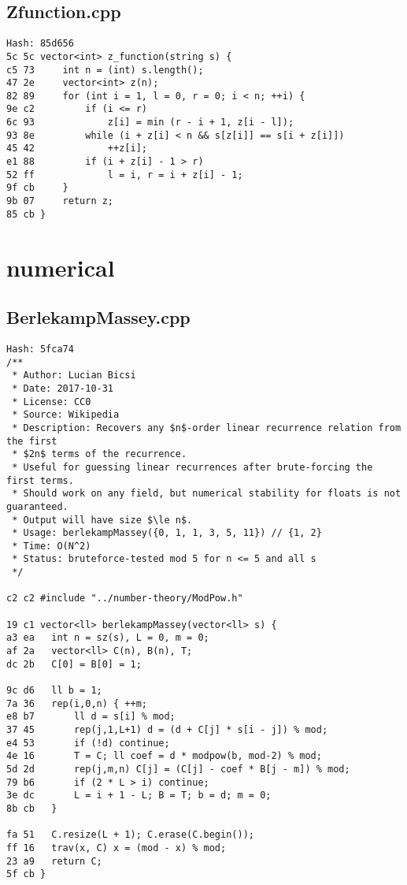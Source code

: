 \documentclass[11pt, a4paper, twoside]{article}
\begin{document}
\subsection{Zfunction.cpp}
\begin{lstlisting}
Hash: 85d656
5c 5c vector<int> z_function(string s) {
c5 73     int n = (int) s.length();
47 2e     vector<int> z(n);
82 89     for (int i = 1, l = 0, r = 0; i < n; ++i) {
9e c2         if (i <= r)
6c 93             z[i] = min (r - i + 1, z[i - l]);
93 8e         while (i + z[i] < n && s[z[i]] == s[i + z[i]])
45 42             ++z[i];
e1 88         if (i + z[i] - 1 > r)
52 ff             l = i, r = i + z[i] - 1;
9f cb     }
9b 07     return z;
85 cb }
\end{lstlisting}



%
%

\section{numerical}

\subsection{BerlekampMassey.cpp}
\begin{lstlisting}
Hash: 5fca74
/**
 * Author: Lucian Bicsi
 * Date: 2017-10-31
 * License: CC0
 * Source: Wikipedia
 * Description: Recovers any $n$-order linear recurrence relation from the first
 * $2n$ terms of the recurrence.
 * Useful for guessing linear recurrences after brute-forcing the first terms.
 * Should work on any field, but numerical stability for floats is not guaranteed.
 * Output will have size $\le n$.
 * Usage: berlekampMassey({0, 1, 1, 3, 5, 11}) // {1, 2}
 * Time: O(N^2)
 * Status: bruteforce-tested mod 5 for n <= 5 and all s
 */

c2 c2 #include "../number-theory/ModPow.h"

19 c1 vector<ll> berlekampMassey(vector<ll> s) {
a3 ea 	int n = sz(s), L = 0, m = 0;
af 2a 	vector<ll> C(n), B(n), T;
dc 2b 	C[0] = B[0] = 1;
      
9c d6 	ll b = 1;
7a 36 	rep(i,0,n) { ++m;
e8 b7 		ll d = s[i] % mod;
37 45 		rep(j,1,L+1) d = (d + C[j] * s[i - j]) % mod;
e4 53 		if (!d) continue;
4e 16 		T = C; ll coef = d * modpow(b, mod-2) % mod;
5d 2d 		rep(j,m,n) C[j] = (C[j] - coef * B[j - m]) % mod;
79 b6 		if (2 * L > i) continue;
3e dc 		L = i + 1 - L; B = T; b = d; m = 0;
8b cb 	}
      
fa 51 	C.resize(L + 1); C.erase(C.begin());
ff 16 	trav(x, C) x = (mod - x) % mod;
23 a9 	return C;
5f cb }
\end{lstlisting}
\end{document}

